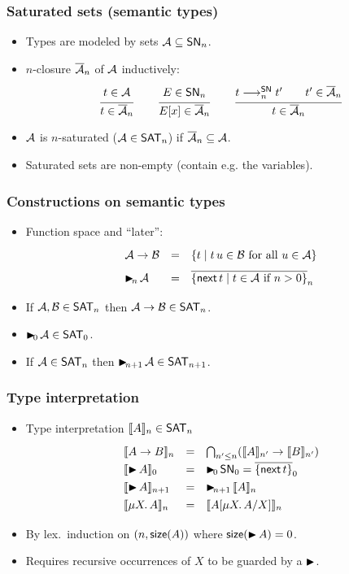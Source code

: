 \documentclass[t]{beamer}
\newcommand{\nex}{\tnext\,}
\newcommand{\redSN}{\red^\SN}
\newcommand{\clos}[1]{\overline{#1}}
\renewcommand{\SN}{\mathsf{SN}}
\newcommand{\SAT}{\mathsf{SAT}}
\newcommand{\slater}[1]{\tlater\!_{#1}\,}
\newcommand{\cAnn}{\color{red!80!black}}%
\renewcommand{\emph}[1]{{\cAnn#1}}
\newcommand{\muT}[2]{\mu {#1} \hspace{-0.1em} . \,  {#2}}
\begin{document}
\begin{frame}%
  \frametitle{Saturated sets (semantic types)}
  \begin{itemize}
  \item Types are modeled by sets $\A \subseteq \SN_n$.
  \item $n$-closure $\clos \A _n$ of $\mathcal{A}$ inductively:
\[
  \ru{t \in \A}{t \in \clos \A _n}
\qquad
  \ru{E \in \SN_n}{E[x] \in \clos \A _n}
\qquad
  \ru{t \redSN_n t' \qquad t' \in \clos \A _n
    }{t \in \clos \A _n}
\]
  \item $\mathcal{A}$ is $n$-saturated ($\A \in \SAT_n$) if $\clos\A_n
    \subseteq \A$.
  \item Saturated sets are non-empty (contain e.g. the variables).
  \end{itemize}
\end{frame}


\begin{frame}%
  \frametitle{Constructions on semantic types}
  \begin{itemize}
  \item Function space and ``later'':
\[
\begin{array}{lcl}
  \A \to \B   & = & \{ t \mid t\,u \in \B \mforall u \in \A \} \\[1ex]
  \slater n \A & = & \clos{\{ \nex t \mid t \in \A \mif n>0 \}}_n \\
\end{array}
\]
  \item If $\A,\B \in \SAT_n$ then $\A \to \B \in \SAT_n$.
  \item $\slater 0 \A \in \SAT_0$.
  \item If $\A \in \SAT_n$ then $\slater {n+1} \A \in \SAT_{n+1}$.
  \end{itemize}
\end{frame}


\begin{frame}%
  \frametitle{Type interpretation}
  \begin{itemize}
  \item Type interpretation $\Den A n \in \SAT_n$
\[
\def\arraystretch{1.3}
 \begin{array}{lcl}
   \Den{A \to B}n & = & \bigcap_{n' \leq n} (\Den A{n'} \to \Den{B}{n'})
   \\
   \Den{\later A}0 & = & \slater 0 \SN_0 = \clos{\{ \nex t \}}_0 \\
   \Den{\later A}{n+1} & = & \slater{n+1} \Den A n \\
   \Den{\muT X A}n & = & \Den{\subst {\muT X A} X A}n \\
 \end{array}
\]
\vspace{-2ex}
\item
By lex.\ induction on $(n,\mathsf{size}(A))$ where $\mathsf{size}(\mathord{\blacktriangleright}\, A) = 0$.
\item Requires recursive occurrences of $X$ to be \emph{guarded} by a $\mathord{\blacktriangleright}$.
  \end{itemize}
\end{frame}
\end{document}
